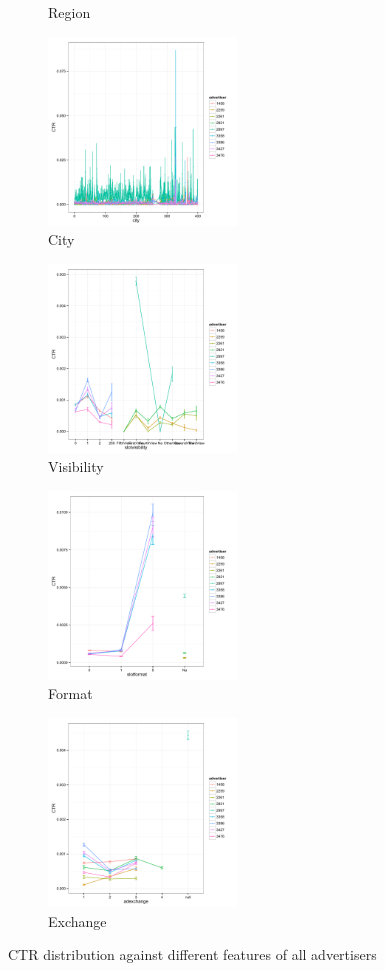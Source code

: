 \begin{figure}[htbp]
\begin{subfigure}{0.5\textwidth}
\caption{Region}
\label{fig:region}
\end{subfigure}
\begin{subfigure}{0.5\textwidth}
\includegraphics[width=0.9\linewidth, height=5cm]{city.pdf}
\caption{City}
\label{fig:city}
\end{subfigure}
\begin{subfigure}{0.5\textwidth}
\includegraphics[width=0.9\linewidth, height=5cm]{visibility.pdf}
\caption{Visibility}
\label{fig:visibility}
\end{subfigure}
\begin{subfigure}{0.5\textwidth}
\includegraphics[width=0.9\linewidth, height=5cm]{format.pdf}
\caption{Format}
\label{fig:format}
\end{subfigure}
 \begin{subfigure}{0.5\textwidth}
\includegraphics[width=0.9\linewidth, height=5cm]{exchange.pdf}
\caption{Exchange}
\label{fig:exchange}
\end{subfigure}

\caption{CTR distribution against different features of all advertisers}
\label{fig:advertiserstatistics}
\end{figure}

